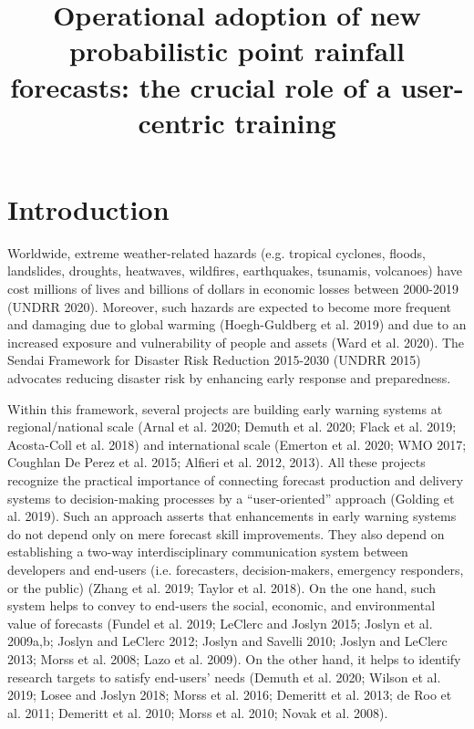 \documentclass[twocol]{ametsocV5} %
\title{Operational adoption of new probabilistic point rainfall forecasts: the crucial role of a user-centric training}
\affiliation{University of Reading, Reading, UK \\
European Centre for Medium-Range Weather Forecasts, Reading, UK}
\begin{document}
\maketitle


\section{Introduction}

Worldwide, extreme weather-related hazards (e.g. tropical cyclones, floods, landslides, droughts, heatwaves, wildfires, earthquakes, tsunamis, volcanoes) have cost millions of lives and billions of dollars in economic losses between 2000-2019 (UNDRR 2020). Moreover, such hazards are expected to become more frequent and damaging due to global warming (Hoegh-Guldberg et al. 2019) and due to an increased exposure and vulnerability of people and assets (Ward et al. 2020). The Sendai Framework for Disaster Risk Reduction 2015-2030 (UNDRR 2015) advocates reducing disaster risk by enhancing early response and preparedness. 

Within this framework, several projects are building early warning systems at regional/national scale (Arnal et al. 2020; Demuth et al. 2020; Flack et al. 2019; Acosta-Coll et al. 2018) and international scale (Emerton et al. 2020; WMO 2017; Coughlan De Perez et al. 2015; Alfieri et al. 2012, 2013). All these projects recognize the practical importance of connecting forecast production and delivery systems to decision-making processes by a “user-oriented” approach (Golding et al. 2019). Such an approach asserts that enhancements in early warning systems do not depend only on mere forecast skill improvements. They also depend on establishing a two-way interdisciplinary communication system between developers and end-users (i.e. forecasters, decision-makers, emergency responders, or the public) (Zhang et al. 2019; Taylor et al. 2018). On the one hand, such system helps to convey to end-users the social, economic, and environmental value of forecasts (Fundel et al. 2019; LeClerc and Joslyn 2015; Joslyn et al. 2009a,b; Joslyn and LeClerc 2012; Joslyn and Savelli 2010; Joslyn and LeClerc 2013; Morss et al. 2008; Lazo et al. 2009). On the other hand, it helps to identify research targets to satisfy end-users’ needs (Demuth et al. 2020; Wilson et al. 2019; Losee and Joslyn 2018; Morss et al. 2016; Demeritt et al. 2013; de Roo et al. 2011; Demeritt et al. 2010; Morss et al. 2010; Novak et al. 2008). 
\end{document}
